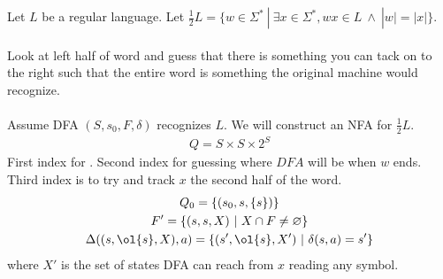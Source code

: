 \documentclass[class=scrartcl, crop=false]{standalone}
\begin{document}
\begin{example}
  Let $L$ be a regular language. Let $\frac{1}{2}L = \{w \in \Sigma^* \ | \
  \exists x \in \Sigma^*, wx \in L \ \wedge \ |w| = |x|\}$.
  \\\\
  Look at left half of word and guess that there is something you can tack on to
  the right such that the entire word is something the original machine would
  recognize.
  \\\\
  Assume DFA $(S, s_0, F, \delta)$ recognizes $L$. We will construct an NFA for
  $\frac{1}{2}L$.
  \begin{gather*}
    Q = S \times S \times 2^S
  \end{gather*}
  First index for . Second index for guessing where $DFA$ will be when $w$ ends.
  Third index is to try and track $x$ the second half of the word.
  \begin{gather*}
    Q_0 = \{(s_0, s, \{s\})\} \\
    F' = \{(s, s, X) \ | \ X \cap F \neq \varnothing\} \\
    \Delta((s, \ol{s}, X), a) = \{(s', \ol{s}, X') \ | \ \delta(s, a) = s'\}
  \end{gather*}
  where $X'$ is the set of states DFA can reach from $x$ reading any
  symbol. %
\end{example}
\end{document}
